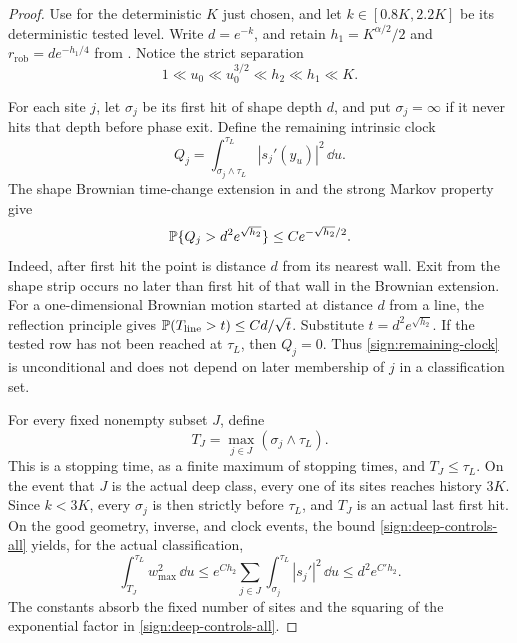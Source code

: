 \begin{proof}
Use  for the deterministic \(K\) just chosen,
and let \(k\in[0.8K,2.2K]\) be its deterministic tested level.
Write \(d=e^{-k}\), and retain
\(h_1=K^{\alpha/2}/2\) and
\(r_{\mathrm{rob}}=d e^{-h_1/4}\) from
.  Notice the strict separation
\begin{equation}\label{sign:scale-separation}
 1\ll u_0\ll u_0^{3/2}\ll h_2\ll h_1\ll K.
\end{equation}

For each site \(j\), let \(\sigma_j\) be its first hit of shape
depth \(d\), and put \(\sigma_j=\infty\) if it never hits that
depth before phase exit.  Define the remaining intrinsic clock
\[
 Q_j=\int_{\sigma_j\wedge\tau_L}^{\tau_L}|s_j'(y_u)|^2\,\dd u.
\]
The shape Brownian time-change extension in
 and the strong Markov property give
\begin{equation}\label{sign:remaining-clock}
 \mathbb P\{Q_j>d^2e^{\sqrt{h_2}}\}
       \le C e^{-\sqrt{h_2}/2}.
\end{equation}
Indeed, after first hit the point is distance \(d\) from its
nearest wall.  Exit from the shape strip occurs no later than first
hit of that wall in the Brownian extension.  For a one-dimensional
Brownian motion started at distance \(d\) from a line, the reflection
principle gives
\(\mathbb P(T_{\mathrm{line}}>t)\le C d/\sqrt t\).
Substitute \(t=d^2e^{\sqrt{h_2}}\).  If the tested row has not been
reached at \(\tau_L\), then \(Q_j=0\).  Thus
\eqref{sign:remaining-clock} is unconditional and does not depend
on later membership of \(j\) in a classification set.

For every fixed nonempty subset \(J\), define
\begin{equation}\label{sign:last-hit-stop}
 T_J=\max_{j\in J}(\sigma_j\wedge\tau_L).
\end{equation}
This is a stopping time, as a finite maximum of stopping times, and
\(T_J\le\tau_L\).  On the event that \(J\) is the actual deep
class, every one of its sites reaches history \(3K\).  Since
\(k<3K\), every \(\sigma_j\) is then strictly before
\(\tau_L\), and \(T_J\) is an actual last first hit.
On the good geometry, inverse, and clock events, the bound
\eqref{sign:deep-controls-all} yields, for the actual classification,
\begin{equation}\label{sign:w-clock}
 \int_{T_J}^{\tau_L}w_{\max}^2\,\dd u
 \le e^{Ch_2}\sum_{j\in J}
       \int_{\sigma_j}^{\tau_L}|s_j'|^2\,\dd u
 \le d^2e^{C'h_2}.
\end{equation}
The constants absorb the fixed number of sites and the squaring of
the exponential factor in \eqref{sign:deep-controls-all}.


\end{proof}
